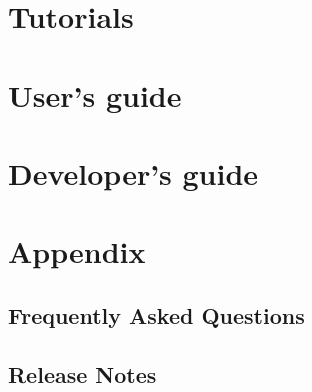 \documentclass{InsightSoftwareGuide}
\begin{document}




\part{Tutorials}\label{part:tutorials}




\part{User's guide}\label{part:userguide}



























\part{Developer's guide}\label{part:developerguide}







\part{Appendix}\label{part:appendix}
\chapter{Frequently Asked Questions}
\label{sec:FrequentlyAskedQuestions}


\chapter{Release Notes}
\label{sec:ReleaseNotes}

\end{document}

